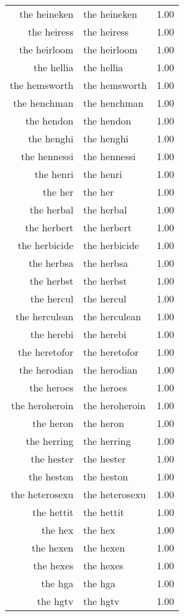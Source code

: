 \begin{table}[ht]
\begin{tabular}{rlr}
  the heineken & the heineken & 1.00 \\ 
  the heiress & the heiress & 1.00 \\ 
  the heirloom & the heirloom & 1.00 \\ 
  the hellia & the hellia & 1.00 \\ 
  the hemsworth & the hemsworth & 1.00 \\ 
  the henchman & the henchman & 1.00 \\ 
  the hendon & the hendon & 1.00 \\ 
  the henghi & the henghi & 1.00 \\ 
  the hennessi & the hennessi & 1.00 \\ 
  the henri & the henri & 1.00 \\ 
  the her & the her & 1.00 \\ 
  the herbal & the herbal & 1.00 \\ 
  the herbert & the herbert & 1.00 \\ 
  the herbicide & the herbicide & 1.00 \\ 
  the herbsa & the herbsa & 1.00 \\ 
  the herbst & the herbst & 1.00 \\ 
  the hercul & the hercul & 1.00 \\ 
  the herculean & the herculean & 1.00 \\ 
  the herebi & the herebi & 1.00 \\ 
  the heretofor & the heretofor & 1.00 \\ 
  the herodian & the herodian & 1.00 \\ 
  the heroes & the heroes & 1.00 \\ 
  the heroheroin & the heroheroin & 1.00 \\ 
  the heron & the heron & 1.00 \\ 
  the herring & the herring & 1.00 \\ 
  the hester & the hester & 1.00 \\ 
  the heston & the heston & 1.00 \\ 
  the heterosexu & the heterosexu & 1.00 \\ 
  the hettit & the hettit & 1.00 \\ 
  the hex & the hex & 1.00 \\ 
  the hexen & the hexen & 1.00 \\ 
  the hexes & the hexes & 1.00 \\ 
  the hga & the hga & 1.00 \\ 
  the hgtv & the hgtv & 1.00 \\ 

\end{tabular}
\end{table}
